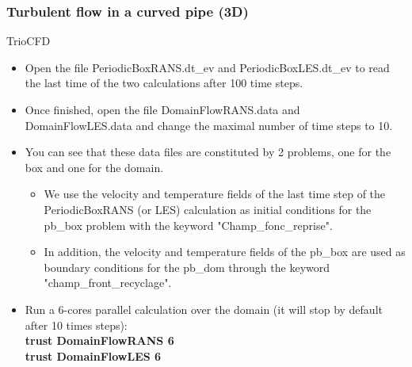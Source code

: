 \documentclass[10pt, hyperref={unicode=true,pdfusetitle, bookmarks=true,bookmarksnumbered=false,bookmarksopen=false, breaklinks=false,pdfborder={0 0 1},backref=true,colorlinks=true,linkcolor=darkblue,pageanchor}]{beamer}
\begin{document}
\begin{frame}
\frametitle{Turbulent flow in a curved pipe (3D)}
\begin{block}{TrioCFD}

\begin{itemize}
\item Open the file PeriodicBoxRANS.dt\_ev and PeriodicBoxLES.dt\_ev to read the last time of the two calculations after 100 time steps.

\item Once finished, open the file DomainFlowRANS.data and DomainFlowLES.data and change the maximal number of time steps to 10.

\item You can see that these data files are constituted by 2 problems, one for the box and one for the domain.
    \begin {itemize}
    \item We use the velocity and temperature fields of the last time step of the PeriodicBoxRANS (or LES) calculation as initial conditions for the pb\_box problem with the keyword "Champ\_fonc\_reprise".
    \item In addition, the velocity and temperature fields of the pb\_box are used as boundary conditions for the pb\_dom through the keyword "champ\_front\_recyclage".
    \end{itemize}

\item Run a 6-cores parallel calculation over the domain (it will stop by default after 10 times steps):\\
\textbf{trust DomainFlowRANS 6}\\
\textbf{trust DomainFlowLES 6}

\end{itemize}

\end{block}
\end{frame}
\end{document}
